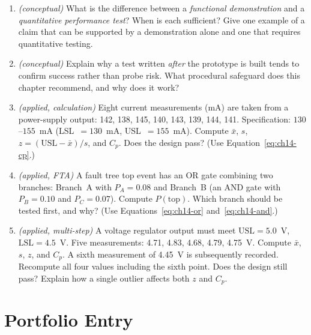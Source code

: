 \begin{enumerate}
  \item \textit{(conceptual)} What is the difference between a \emph{functional
        demonstration} and a \emph{quantitative performance test}?
        When is each sufficient?
        Give one example of a claim that can be supported by a demonstration alone and one
        that requires quantitative testing.

  \item \textit{(conceptual)} Explain why a test written \emph{after} the prototype is
        built tends to confirm success rather than probe risk.
        What procedural safeguard does this chapter recommend, and why does it work?

  \item \textit{(applied, calculation)} Eight current measurements (mA) are taken from
        a power-supply output:
        142, 138, 145, 140, 143, 139, 144, 141.
        Specification: $130$--$155$~mA (\textrm{LSL}~$= 130$~mA, \textrm{USL}~$= 155$~mA).
        Compute $\bar{x}$, $s$, $z = (\text{USL}-\bar{x})/s$, and $C_p$.
        Does the design pass?
        (Use Equation~\ref{eq:ch14-cp}.)

  \item \textit{(applied, FTA)} A fault tree top event has an OR gate combining two
        branches: Branch~A with $P_A = 0.08$ and Branch~B (an AND gate with
        $P_B = 0.10$ and $P_C = 0.07$).
        Compute $P(\text{top})$.
        Which branch should be tested first, and why?
        (Use Equations~\ref{eq:ch14-or} and~\ref{eq:ch14-and}.)

  \item \textit{(applied, multi-step)} A voltage regulator output must meet
        $\text{USL} = 5.0$~V, $\text{LSL} = 4.5$~V.
        Five measurements: 4.71, 4.83, 4.68, 4.79, 4.75~V.
        Compute $\bar{x}$, $s$, $z$, and $C_p$.
        A sixth measurement of 4.45~V is subsequently recorded.
        Recompute all four values including the sixth point.
        Does the design still pass?
        Explain how a single outlier affects both $z$ and $C_p$.
\end{enumerate}

\section*{Portfolio Entry}
\label{sec:ch14-portfolio}

